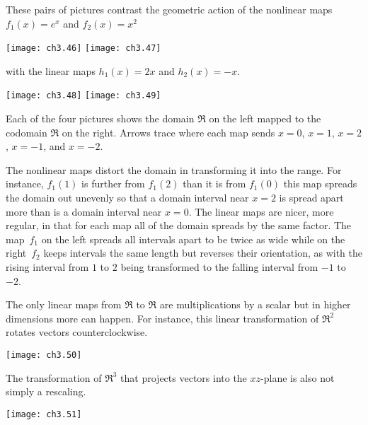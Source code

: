 These pairs of pictures contrast the geometric action of the nonlinear maps
\( f_1(x)=e^x \) and \( f_2(x)=x^2 \) 
\begin{center}
  \texttt{[image: ch3.46]}
  \hspace*{4em}
  \texttt{[image: ch3.47]}
\end{center}
with the linear maps
\( h_1(x)=2x \) and \( h_2(x)=-x \).
\begin{center}
  \texttt{[image: ch3.48]}
  \hspace*{4em}
  \texttt{[image: ch3.49]}
\end{center}
Each of the four pictures shows the domain $\Re$ on the left 
mapped to the codomain $\Re$ on the right. 
Arrows trace where each map sends
$x=0$, $x=1$, $x=2$, $x=-1$, and $x=-2$.

The nonlinear maps distort
the domain in transforming it into the range.
For instance,
\( f_1(1) \) is further from
$f_1(2)$ than it is from $f_1(0)$ \Dash  this map spreads
the domain out unevenly so that a domain interval near $x=2$ is 
spread apart more 
than is a domain interval near $x=0$.
The linear maps are nicer, more regular, 
in that for each map all of the domain 
spreads by the same factor.
The map~$f_1$ on the left spreads all intervals apart to be twice as wide 
while on the right~$f_2$ keeps intervals the same length but reverses
their orientation, as with the rising interval from $1$ to $2$ 
being transformed 
to the falling interval from $-1$ to~$-2$.

The only linear maps from $\Re$ to $\Re$ are multiplications by a scalar but
in higher dimensions more can happen. 
For instance, this linear transformation of $\Re^2$
rotates vectors counterclockwise.
\begin{center}
  \texttt{[image: ch3.50]}
\end{center}
The transformation of $\Re^3$ 
that projects vectors into the $xz$-plane
is also not simply a rescaling.
\begin{center}
 \texttt{[image: ch3.51]}
\end{center}

